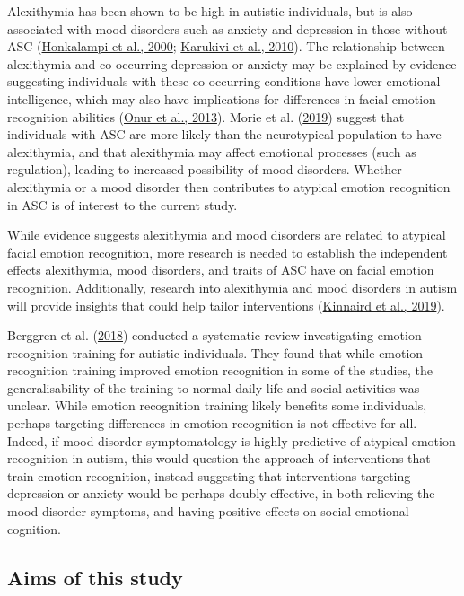 \documentclass[
]{article}
\begin{document}
Alexithymia has been shown to be high in autistic individuals, but is also associated with mood disorders such as anxiety and depression in those without ASC (\protect\hyperlink{ref-honkalampi2000a}{Honkalampi et al., 2000}; \protect\hyperlink{ref-karukivi2010a}{Karukivi et al., 2010}). The relationship between alexithymia and co-occurring depression or anxiety may be explained by evidence suggesting individuals with these co-occurring conditions have lower emotional intelligence, which may also have implications for differences in facial emotion recognition abilities (\protect\hyperlink{ref-onur2013a}{Onur et al., 2013}). Morie et al. (\protect\hyperlink{ref-morie2019a}{2019}) suggest that individuals with ASC are more likely than the neurotypical population to have alexithymia, and that alexithymia may affect emotional processes (such as regulation), leading to increased possibility of mood disorders. Whether alexithymia or a mood disorder then contributes to atypical emotion recognition in ASC is of interest to the current study.

While evidence suggests alexithymia and mood disorders are related to atypical facial emotion recognition, more research is needed to establish the independent effects alexithymia, mood disorders, and traits of ASC have on facial emotion recognition. Additionally, research into alexithymia and mood disorders in autism will provide insights that could help tailor interventions (\protect\hyperlink{ref-kinnaird2019a}{Kinnaird et al., 2019}).

Berggren et al. (\protect\hyperlink{ref-berggren2018a}{2018}) conducted a systematic review investigating emotion recognition training for autistic individuals. They found that while emotion recognition training improved emotion recognition in some of the studies, the generalisability of the training to normal daily life and social activities was unclear. While emotion recognition training likely benefits some individuals, perhaps targeting differences in emotion recognition is not effective for all. Indeed, if mood disorder symptomatology is highly predictive of atypical emotion recognition in autism, this would question the approach of interventions that train emotion recognition, instead suggesting that interventions targeting depression or anxiety would be perhaps doubly effective, in both relieving the mood disorder symptoms, and having positive effects on social emotional cognition.

\hypertarget{aims-of-this-study}{%
\subsection*{Aims of this study}\label{aims-of-this-study}}
\end{document}
